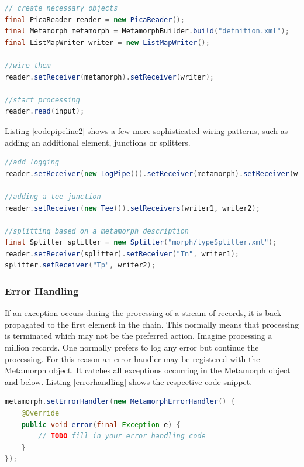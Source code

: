 \documentclass[12pt,a4paper]{article}
\begin{document}
\begin{lstlisting}[float=htb, label=codepipeline1,caption= Putting together a processing pipeline according to the pattern in section \ref{pipeline}., language=Java]
// create necessary objects
final PicaReader reader = new PicaReader();
final Metamorph metamorph = MetamorphBuilder.build("defnition.xml");
final ListMapWriter writer = new ListMapWriter();

//wire them
reader.setReceiver(metamorph).setReceiver(writer);

//start processing
reader.read(input);

\end{lstlisting}

Listing \ref{codepipeline2} shows a few more sophisticated wiring patterns, such as adding an additional element, junctions or splitters.

\begin{lstlisting}[float=htb, label=codepipeline2,caption= Advanced wiring., language=Java]
//add logging
reader.setReceiver(new LogPipe()).setReceiver(metamorph).setReceiver(writer);

//adding a tee junction
reader.setReceiver(new Tee()).setReceivers(writer1, writer2);

//splitting based on a metamorph description
final Splitter splitter = new Splitter("morph/typeSplitter.xml");
reader.setReceiver(splitter).setReceiver("Tn", writer1);
splitter.setReceiver("Tp", writer2);
\end{lstlisting}


\subsubsection{Error Handling}
If an exception occurs during the processing of a stream of records, it is back propagated to the first element in the chain. This normally means that processing is terminated which may not be the preferred action. Imagine processing a million records. One normally prefers to log any error but continue the processing.
For this reason an error handler may be registered with the Metamorph object. It catches all exceptions occurring in the Metamorph object and below. Listing \ref{errorhandling} shows the respective code snippet.  
\begin{lstlisting}[float=htb, label=errorhandling,caption= Registering an error handler., language=Java]
metamorph.setErrorHandler(new MetamorphErrorHandler() {
	@Override
	public void error(final Exception e) {
		// TODO fill in your error handling code
	}
});
\end{lstlisting}
\end{document}
